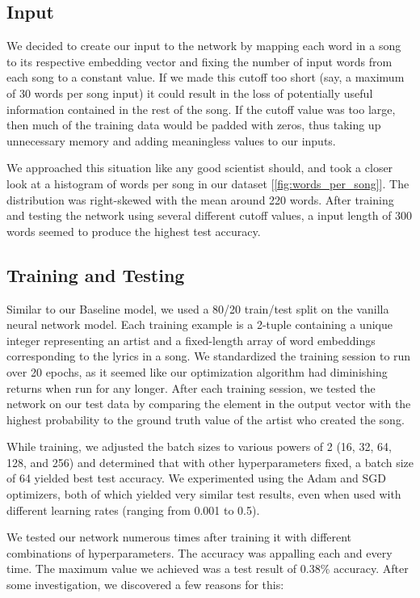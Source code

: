 \documentclass[11pt,a4paper]{article}
\begin{document}
\subsection{Input}

We decided to create our input to the network by mapping each word in a song to its respective embedding vector and fixing the number of input words from each song to a constant value. If we made this cutoff too short (say, a maximum of 30 words per song input) it could result in the loss of potentially useful information contained in the rest of the song. If the cutoff value was too large, then much of the training data would be padded with zeros, thus taking up unnecessary memory and adding meaningless values to our inputs.

We approached this situation like any good scientist should, and took a closer look at a histogram of words per song in our dataset [\ref{fig:words_per_song}]. The distribution was right-skewed with the mean around 220 words. After training and testing the network using several different cutoff values, a input length of 300 words seemed to produce the highest test accuracy.


\subsection{Training and Testing} 

Similar to our Baseline model, we used a 80/20 train/test split on the vanilla neural network model. Each training example is a 2-tuple containing a unique integer representing an artist and a fixed-length array of word embeddings corresponding to the lyrics in a song. We standardized the training session to run over 20 epochs, as it seemed like our optimization algorithm had diminishing returns when run for any longer. After each training session, we tested the network on our test data by comparing the element in the output vector with the highest probability to the ground truth value of the artist who created the song.

While training, we adjusted the batch sizes to various powers of 2 (16, 32, 64, 128, and 256) and determined that with other hyperparameters fixed, a batch size of 64 yielded best test accuracy. We experimented using the Adam and SGD optimizers, both of which yielded very similar test results, even when used with different learning rates (ranging from 0.001 to 0.5). 

We tested our network numerous times after training it with different combinations of hyperparameters. The accuracy was appalling each and every time. The maximum value we achieved was a test result of 0.38\% accuracy. After some investigation, we discovered a few reasons for this:
\end{document}
